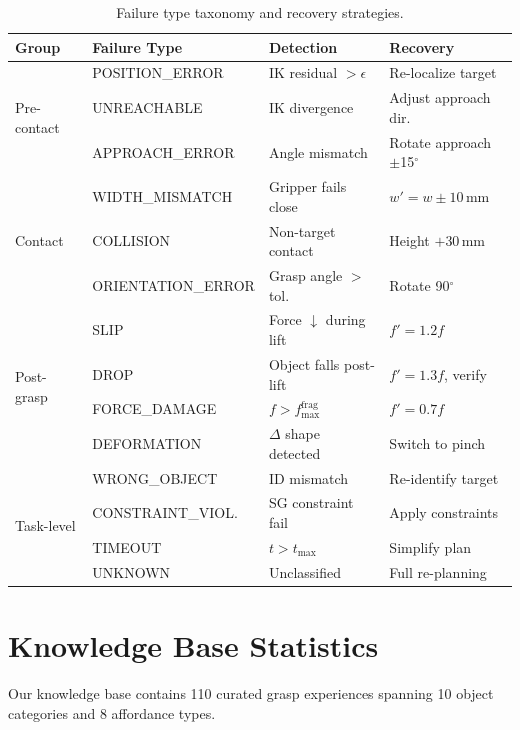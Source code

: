 \documentclass[letterpaper, 10pt]{article}
\begin{document}
\begin{table}[h]
\centering
\caption{Failure type taxonomy and recovery strategies.}
\label{tab:failure_types}
\setlength{\tabcolsep}{3pt}
\begin{tabular}{@{}llll@{}}
\toprule
\textbf{Group} & \textbf{Failure Type} & \textbf{Detection} & \textbf{Recovery} \\
\midrule
\multirow{3}{*}{Pre-contact}
 & POSITION\_ERROR & IK residual $> \epsilon$ & Re-localize target \\
 & UNREACHABLE & IK divergence & Adjust approach dir. \\
 & APPROACH\_ERROR & Angle mismatch & Rotate approach $\pm$15$^\circ$ \\
\midrule
\multirow{3}{*}{Contact}
 & WIDTH\_MISMATCH & Gripper fails close & $w' = w \pm 10$\,mm \\
 & COLLISION & Non-target contact & Height $+$30\,mm \\
 & ORIENTATION\_ERROR & Grasp angle $>$ tol. & Rotate 90$^\circ$ \\
\midrule
\multirow{4}{*}{Post-grasp}
 & SLIP & Force $\downarrow$ during lift & $f' = 1.2f$ \\
 & DROP & Object falls post-lift & $f' = 1.3f$, verify \\
 & FORCE\_DAMAGE & $f > f_{\max}^{\text{frag}}$ & $f' = 0.7f$ \\
 & DEFORMATION & $\Delta$ shape detected & Switch to pinch \\
\midrule
\multirow{4}{*}{Task-level}
 & WRONG\_OBJECT & ID mismatch & Re-identify target \\
 & CONSTRAINT\_VIOL. & SG constraint fail & Apply constraints \\
 & TIMEOUT & $t > t_{\max}$ & Simplify plan \\
 & UNKNOWN & Unclassified & Full re-planning \\
\bottomrule
\end{tabular}
\end{table}

\section{Knowledge Base Statistics}

Our knowledge base contains 110 curated grasp experiences spanning 10 object categories and 8 affordance types.
\end{document}
